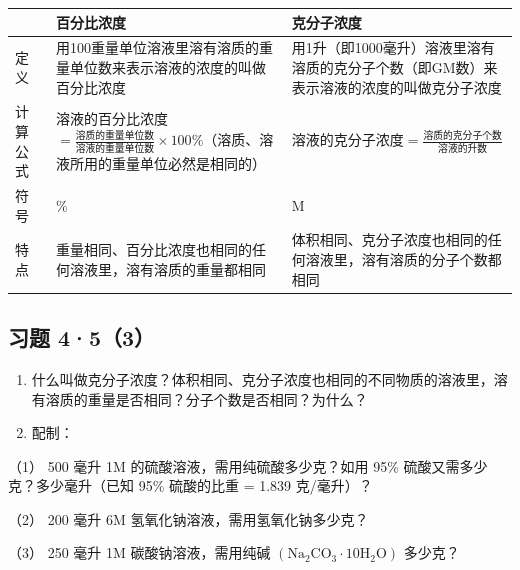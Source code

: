 {\def\LTcaptype{none} %
\begin{longtable}[]{@{}
  >{\raggedright\arraybackslash}p{}
  >{\raggedright\arraybackslash}p{}
  >{\raggedright\arraybackslash}p{}@{}}
\toprule\noalign{}
\begin{minipage}[b]{\linewidth}\raggedright
\end{minipage} & \begin{minipage}[b]{\linewidth}\raggedright
百分比浓度
\end{minipage} & \begin{minipage}[b]{\linewidth}\raggedright
克分子浓度
\end{minipage} \\
\midrule\noalign{}
\endhead
\bottomrule\noalign{}
\endlastfoot
定义 &
用100重量单位溶液里溶有溶质的重量单位数来表示溶液的浓度的叫做百分比浓度
&
用1升（即1000毫升）溶液里溶有溶质的克分子个数（即GM数）来表示溶液的浓度的叫做克分子浓度 \\
计算公式 &
溶液的百分比浓度\(= \frac{\text{溶质的重量单位数}}{\text{溶液的重量单位数}} \times 100\%\)（溶质、溶液所用的重量单位必然是相同的）
&
溶液的克分子浓度\(= \frac{\text{溶质的克分子个数}}{\text{溶液的升数}}\) \\
符号 & \% & M \\
特点 & 重量相同、百分比浓度也相同的任何溶液里，溶有溶质的重量都相同 &
体积相同、克分子浓度也相同的任何溶液里，溶有溶质的分子个数都相同 \\
\end{longtable}
}

\subsection{习题 4·5（3）}

\begin{enumerate}
\item
  什么叫做克分子浓度？体积相同、克分子浓度也相同的不同物质的溶液里，溶有溶质的重量是否相同？分子个数是否相同？为什么？
\item
  配制：
\end{enumerate}

（1） 500 毫升 1M 的硫酸溶液，需用纯硫酸多少克？如用 95\%
硫酸又需多少克？多少毫升（已知 95\% 硫酸的比重 = 1.839 克/毫升）？

（2） 200 毫升 6M 氢氧化钠溶液，需用氢氧化钠多少克？

（3） 250 毫升 1M 碳酸钠溶液，需用纯碱
\(\left(\mathrm{Na}_{2}\mathrm{CO}_{3} \cdot 10\mathrm{H}_{2}\mathrm{O}\right)\)
多少克？

